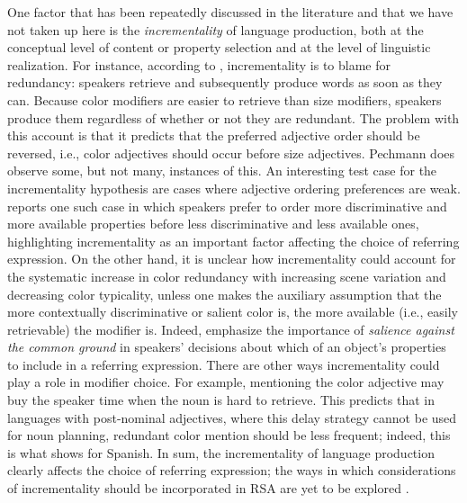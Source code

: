 \documentclass[11pt]{article}
\begin{document}
One factor that has been repeatedly discussed in the literature and that we have not taken up here is the \emph{incrementality} of language production, both at the conceptual level of content or property selection and at the level of linguistic realization. For instance, according to , incrementality is to blame for redundancy: speakers retrieve and subsequently produce words as soon as they can. Because color modifiers are easier to retrieve than size modifiers, speakers produce them regardless of whether or not they are redundant. The problem with this account is that it predicts that the preferred adjective order should be reversed, i.e., color adjectives should occur before size adjectives. Pechmann does observe some, but not many, instances of this. An interesting test case for the incrementality hypothesis are cases where adjective ordering preferences are weak.  reports one such case in which speakers prefer to order more discriminative and more available properties before less discriminative and less available ones, highlighting incrementality as an important factor affecting the choice of referring expression. On the other hand, it is unclear how incrementality could account for the systematic increase in color redundancy with increasing scene variation and decreasing color typicality, unless one makes the auxiliary assumption that the more contextually discriminative or salient color is, the more available (i.e., easily retrievable) the modifier is. Indeed,  emphasize the importance of \emph{salience against the common ground} in speakers' decisions about which of an object's properties to include in a referring expression. %
There are other ways incrementality could play a role in modifier choice. For example, mentioning the color adjective may buy the speaker time when the noun is hard to retrieve. This predicts that in languages with post-nominal adjectives, where this delay strategy cannot be used for noun planning, redundant color mention should be less frequent; indeed, this is what  shows for Spanish. In sum, the incrementality of language production clearly affects the choice of referring expression; the ways in which considerations of incrementality should be incorporated in RSA are yet to be explored \cite<but see>[for an incremental extension of RSA]{cohn2018}.
\end{document}
